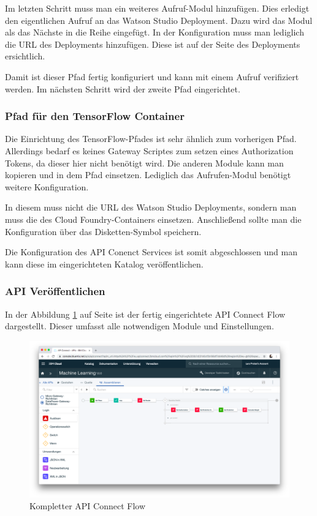 Im letzten Schritt muss man ein weiteres Aufruf-Modul hinzufügen. Dies erledigt den eigentlichen Aufruf an das Watson
Studio Deployment. Dazu wird das Modul als das Nächste in die Reihe eingefügt. In der Konfiguration muss man lediglich
die URL des Deployments hinzufügen. Diese ist auf der Seite des Deployments ersichtlich.

Damit ist dieser Pfad fertig konfiguriert und kann mit einem Aufruf verifiziert werden. Im nächsten Schritt wird der
zweite Pfad eingerichtet.

\subsubsection*{Pfad für den TensorFlow Container}
Die Einrichtung des TensorFlow-Pfades ist sehr ähnlich zum vorherigen Pfad. Allerdings bedarf es keines Gateway Scriptes
zum setzen eines Authorization Tokens, da dieser hier nicht benötigt wird. Die anderen Module kann man kopieren und in
dem Pfad einsetzen. Lediglich das Aufrufen-Modul benötigt weitere Konfiguration.

In diesem muss nicht die URL des Watson Studio Deployments, sondern man muss die des Cloud Foundry-Containers einsetzen.
Anschließend sollte man die Konfiguration über das Disketten-Symbol speichern.

Die Konfiguration des API Conenct Services ist somit abgeschlossen und man kann diese im eingerichteten Katalog
veröffentlichen.

\subsubsection{API Veröffentlichen}
In der Abbildung \ref{fig:umsetzung_api_connect} auf Seite \pageref{fig:umsetzung_api_connect} ist der fertig eingerichtete
API Connect Flow dargestellt. Dieser umfasst alle notwendigen Module und Einstellungen.

\begin{figure}[h]
    \centering
    \includegraphics[width=\textwidth]{images/kapitel_3/api_connect.png}
    \caption{Kompletter API Connect Flow}
    \label{fig:umsetzung_api_connect}
\end{figure}


